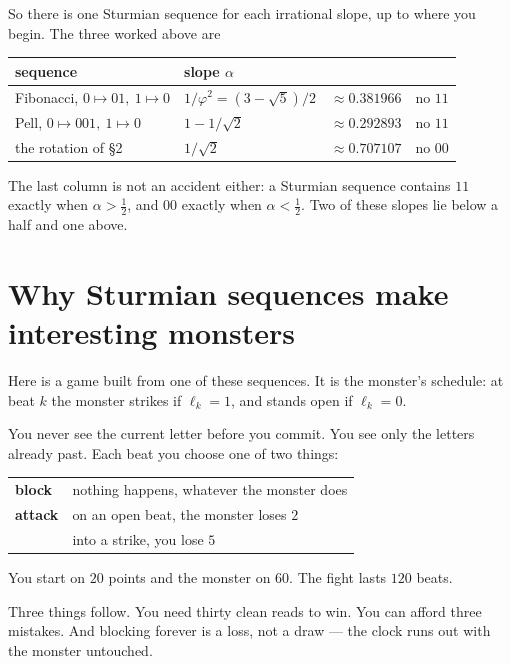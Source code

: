 \documentclass[11pt,a4paper]{article}
\theoremstyle{definition}
\theoremstyle{plain}
\begin{document}
So there is one Sturmian sequence for each irrational slope, up to where you
begin. The three worked above are

\begin{center}
\begin{tabular}{llll}
\toprule
sequence & slope $\alpha$ & & \\ \midrule
Fibonacci, $0 \mapsto 01,\ 1 \mapsto 0$ & $1/\varphi^{2} = (3-\sqrt{5})/2$ & $\approx 0.381966$ & no $11$ \\
Pell, $0 \mapsto 001,\ 1 \mapsto 0$     & $1 - 1/\sqrt{2}$                & $\approx 0.292893$ & no $11$ \\
the rotation of \S2                      & $1/\sqrt{2}$                    & $\approx 0.707107$ & no $00$ \\
\bottomrule
\end{tabular}
\end{center}

The last column is not an accident either: a Sturmian sequence contains $11$
exactly when $\alpha > \tfrac12$, and $00$ exactly when $\alpha < \tfrac12$.
Two of these slopes lie below a half and one above.

\section{Why Sturmian sequences make interesting monsters}

Here is a game built from one of these sequences. It is the monster's schedule:
at beat $k$ the monster strikes if $\ell_k = 1$, and stands open if
$\ell_k = 0$.

You never see the current letter before you commit. You see only the letters
already past. Each beat you choose one of two things:

\begin{center}
\begin{tabular}{ll}
\textbf{block}  & nothing happens, whatever the monster does \\[0.3em]
\textbf{attack} & on an open beat, the monster loses $2$ \\
                & into a strike, you lose $5$ \\
\end{tabular}
\end{center}

You start on $20$ points and the monster on $60$. The fight lasts $120$ beats.

Three things follow. You need thirty clean reads to win. You can afford three
mistakes. And blocking forever is a loss, not a draw --- the clock runs out with
the monster untouched.
\end{document}
